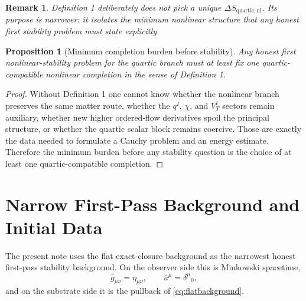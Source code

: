 \documentclass[11pt]{article}
\newtheorem{proposition}{Proposition}
\newtheorem{remark}{Remark}
\begin{document}
\begin{remark}
Definition 1 deliberately does not pick a unique \(\Delta S_{\mathrm{quartic,nl}}\). Its purpose is narrower: it isolates the minimum nonlinear structure that any honest first stability problem must state explicitly.
\end{remark}

\begin{proposition}[Minimum completion burden before stability]
Any honest first nonlinear-stability problem for the quartic branch must at least fix one quartic-compatible nonlinear completion in the sense of Definition 1.
\end{proposition}

\begin{proof}
Without Definition 1 one cannot know whether the nonlinear branch preserves the same matter route, whether the \(q^I\), \(\chi\), and \(V_T^i\) sectors remain auxiliary, whether new higher ordered-flow derivatives spoil the principal structure, or whether the quartic scalar block remains coercive. Those are exactly the data needed to formulate a Cauchy problem and an energy estimate. Therefore the minimum burden before any stability question is the choice of at least one quartic-compatible completion.
\end{proof}

\section{Narrow First-Pass Background and Initial Data}

The present note uses the flat exact-closure background as the narrowest honest first-pass stability background. On the observer side this is Minkowski spacetime,
\begin{equation}
\bar g_{\mu\nu}=\eta_{\mu\nu},
\qquad
\bar u^\mu=\delta^\mu{}_0,
\label{eq:minkowski}
\end{equation}
and on the substrate side it is the pullback of \eqref{eq:flatbackground}.
\end{document}
